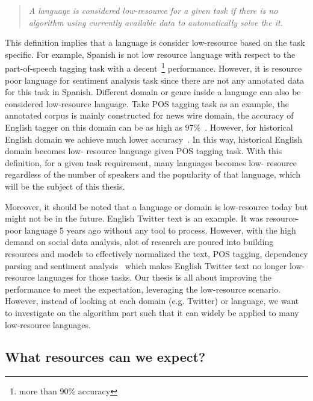 \documentclass[12pt,twoside,final,hidelinks]{ltthesis}
\theoremstyle{definition}
\begin{document}
\begin{quote}
\textit{A language is considered low-resource for a given task if there is no algorithm using currently available data to automatically solve the 
it.}
\end{quote}
This definition implies that a language is consider low-resource based on the task 
specific. For example, Spanish is not low resource language with respect to 
the part-of-speech tagging task with a decent~\footnote{more than 90\% accuracy}
performance. However, it is resource poor language for sentiment analysis task 
since  there are not any annotated data for this task in Spanish. 
Different domain or genre inside a language can also be considered low-resource 
language. Take POS tagging task as an example, the annotated corpus is mainly 
constructed for news wire domain, the accuracy of English tagger on this domain 
can be as high as 97\%~\cite{Toutanova:2003}. However, for historical English 
domain we achieve much lower accuracy~\cite{yang-eisenstein:2016:N16-1}. In this way, historical English domain becomes low-
resource language given POS tagging task. 
With this definition, for a given task requirement, many languages becomes low-
resource regardless of the number of speakers and the popularity of that 
language, which will be the subject of this thesis.%

Moreover, it should be noted that a language or domain is low-resource today but might not be in the future. English Twitter text is an example. It was resource-poor language 5 years ago without any tool to process. However, with the high demand on social data analysis, alot of research are poured into  building resources and models to effectively normalized the text, POS tagging, dependency parsing and sentiment analysis~\cite{han-baldwin:2011:ACL-HLT2011,gimpel-EtAl:2011:ACL-HLT2011,kong-EtAl:2014:EMNLP2014,Agarwal:2011:SAT:2021109.2021114} which makes English Twitter text no longer low-resource languages for those tasks. Our thesis is all about improving the performance to meet the expectation, leveraging the low-resource scenario. However, instead of looking at each domain (e.g. Twitter) or language, we want to investigate on the algorithm part such that it can widely be applied to many low-resource languages.   

\subsection{What resources can we expect?}
\end{document}
